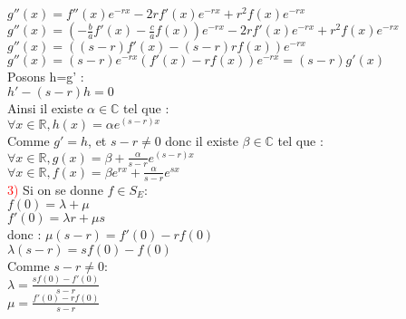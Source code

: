 \documentclass{article}
\begin{document}
	\indent $g''(x)=f''(x)e^{-rx}-2rf'(x)e^{-rx}+r^2f(x)e^{-rx}$ \\
	$g''(x)=(- \frac{b}{a}f'(x)-\frac{c}{a}f(x))e^{-rx} -2r f'(x)e^{-rx}+r^2f(x)e^{-rx}$ \\ 
	$g''(x)=((s-r)f'(x)-(s-r)rf(x))e^{-rx}$ \\ 
	$g''(x)=(s-r)e^{-rx}(f'(x)-rf(x))e^{-rx}=(s-r)g'(x)$ \\ 
	Posons h=g' : \\ 
	$h'-(s-r)h=0$ \\ 
	Ainsi il existe $\alpha \in \mathbb{C}$ tel que : \\ 
	$\forall x \in \mathbb{R},h(x)=\alpha e^{(s-r)x}$ \\ 
	Comme $g'=h$, et $s-r \neq 0$ donc il existe $\beta \in \mathbb{C}$ tel que : \\ 
	$\forall x \in \mathbb{R},g(x)=\beta+\frac{\alpha}{s-r}e^{(s-r)x}$ \\ 
	$\forall x \in \mathbb{R},f(x)=\beta e^{rx}+\frac{\alpha}{s-r}e^{sx}$ \\
	\textcolor{red}{3)} Si on se donne $f \in S_E$: \\ 
	$f(0)=\lambda + \mu $ \\ 
	$f'(0)=\lambda r + \mu s$ \\ 
	donc : $ \mu (s-r)=f'(0)-rf(0) $ \\ 
	$\lambda (s-r)=sf(0)-f(0)$ \\ 
	Comme $s-r \neq 0$: \\ 
	$\lambda =\frac{sf(0)-f'(0)}{s-r}$ \\ 
	$\mu = \frac{f'(0)-rf(0)}{s-r}$
\end{document}
